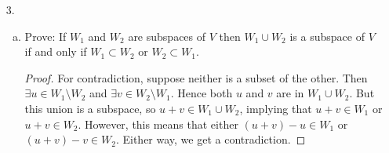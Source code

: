 \begin{itemize}
\begin{enumerate}[(a)]
    \item Find the Jordan normal form $J$ of $A_p$ and a matrix $S$ such that $A = SJS^{-1}$.
    \begin{proof}
    For $p \neq 1$, clearly an eigenvector is $v_1 = (1,0,0)$. A less obvious one is $v_2 = (\frac{1+p}{2},1,1)$. An even more less obvious one is the generalized eigenvector $v_3 = (0,\frac{1}{1-p},\frac{-1}{1-p})$. These show that the eigenvalues are $4,4,6$, where $4$ has multiplicity two. Thus:
    \[J = \begin{bmatrix}
    4 & 1 & 0 \\
    0 & 4 & 0 \\
    0 & 0 & 6
    \end{bmatrix}\] and 
    \[S = \begin{bmatrix}
    1 & 0 & \frac{1+p}{2} \\
    0 & \frac{1}{1-p} & 1 \\
    0 & \frac{-1}{1-p} & 1
    \end{bmatrix}.\]

    When $p=1$, we have the same $v_1$ and $v_2$, but $v_3 = (0, 1, -1)$. Now $J$ is strictly diagonal, as we have three genuine eigenvectors. 
    \end{proof}
    
    \item Prove that $V [A_p] = \{a_0 I + a_1 A _p + ... + a_n A_p^n | a_i \in \bbr, n \in \bbn\}$ with the usual matrix addition and scalar multiplication is a vector space over $R$.
    \begin{proof}
    Check the axioms.
    \end{proof}
    
    \item Find the dimension and a basis for $V [A_p]$.
    \begin{proof}
    The minimal polynomial being $\chi(x) = x^3 - 14x^2 + 64x - 96$ (for $p \neq 1$) implies the dimension is 3. A basis is $[I, A, A^2]$, since $A^3 =  14A^2 - 64A + 96I$. The same idea holds for $p=1$.
    \end{proof}
\end{enumerate}







\item[3.]
\begin{enumerate}[(a)]
    \item Prove: If $W_1$ and $W_2$ are subspaces of $V$ then $W_1 \cup W_2$ is a subspace of $V$ if and only if $W_1 \subset W_2$ or $W_2 \subset W_1$.
    \begin{proof}
    For contradiction, suppose neither is a subset of the other. Then $\exists u \in W_1 \setminus W_2$ and $\exists v \in W_2 \setminus W_1$. Hence both $u$ and $v$ are in $W_1 \cup W_2$. But this union is a subspace, so $u+v \in W_1 \cup W_2$, implying that $u+v \in W_1$ or $u+v \in W_2$. However, this means that either $(u+v) - u \in W_1$ or $(u+v) - v \in W_2$. Either way, we get a contradiction.
    \end{proof}
    

\end{enumerate}
\end{itemize}
